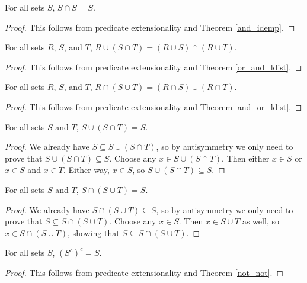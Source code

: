 \documentclass[../../math.tex]{subfiles}
\begin{document}
\begin{theorem} \label{inter_idemp}
    For all sets $S$, $S \cap S = S$.
\end{theorem}
\begin{proof}
    This follows from predicate extensionality and Theorem \ref{and_idemp}.
\end{proof}

\begin{theorem} \label{union_ldist}
    For all sets $R$, $S$, and $T$, $R \cup (S \cap T) = (R \cup S) \cap (R \cup
    T)$.
\end{theorem}
\begin{proof}
    This follows from predicate extensionality and Theorem \ref{or_and_ldist}.
\end{proof}

\begin{theorem} \label{inter_ldist}
    For all sets $R$, $S$, and $T$, $R \cap (S \cup T) = (R \cap S) \cup (R \cap
    T)$.
\end{theorem}
\begin{proof}
    This follows from predicate extensionality and Theorem \ref{and_or_ldist}.
\end{proof}

\begin{theorem} \label{union_inter_self}
    For all sets $S$ and $T$, $S \cup (S \cap T) = S$.
\end{theorem}
\begin{proof}
    We already have $S \subseteq S \cup (S \cap T)$, so by antisymmetry we only
    need to prove that $S \cup (S \cap T) \subseteq S$.  Choose any $x \in S
    \cup (S \cap T)$.  Then either $x \in S$ or $x \in S$ and $x \in T$.  Either
    way, $x \in S$, so $S \cup (S \cap T) \subseteq S$.
\end{proof}

\begin{theorem} \label{inter_union_self}
    For all sets $S$ and $T$, $S \cap (S \cup T) = S$.
\end{theorem}
\begin{proof}
    We already have $S \cap (S \cup T) \subseteq S$, so by antisymmetry we only
    need to prove that $S \subseteq S \cap (S \cup T)$.  Choose any $x \in S$.
    Then $x \in S \cup T$ as well, so $x \in S \cap (S \cup T)$, showing that $S
    \subseteq S \cap (S \cup T)$.
\end{proof}

\begin{theorem} \label{compl_compl}
    For all sets $S$, $(S^c)^c = S$.
\end{theorem}
\begin{proof}
    This follows from predicate extensionality and Theorem \ref{not_not}.
\end{proof}
\end{document}
